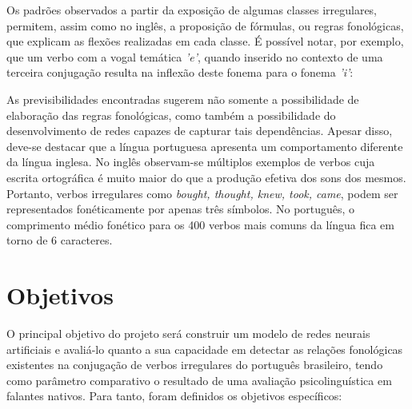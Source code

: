 Os padrões observados a partir da exposição de algumas classes irregulares, permitem, assim como no inglês, a proposição de fórmulas, ou regras fonológicas, que explicam as flexões realizadas em cada classe. É possível notar, por exemplo, que um verbo com a vogal temática \textit{'e'}, quando inserido no contexto de uma terceira conjugação resulta na inflexão deste fonema para o fonema \textit{'i'}:


As previsibilidades encontradas sugerem não somente a possibilidade de elaboração das regras fonológicas, como também a possibilidade do desenvolvimento de redes capazes de capturar tais dependências. Apesar disso, deve-se destacar que a língua portuguesa apresenta um comportamento diferente da língua inglesa. No inglês observam-se múltiplos exemplos de verbos cuja escrita ortográfica é muito maior do que a produção efetiva dos sons dos mesmos. Portanto, verbos irregulares como \textit{bought, thought, knew, took, came}, podem ser representados fonéticamente por apenas três símbolos. No português, o comprimento médio fonético para os 400 verbos mais comuns da língua fica em torno de 6 caracteres.

\section{Objetivos}
\label{sec:objectives}

O principal objetivo do projeto será construir um modelo de redes neurais artificiais e avaliá-lo quanto a sua capacidade em detectar as relações fonológicas existentes na conjugação de verbos irregulares do português brasileiro, tendo como parâmetro comparativo o resultado de uma avaliação psicolinguística em falantes nativos.
Para tanto, foram definidos os objetivos específicos:

